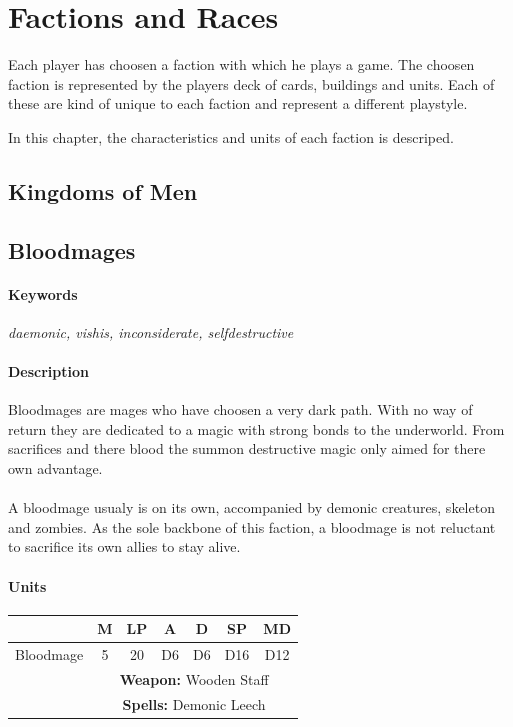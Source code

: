 \documentclass[a5paper,pagesize,10pt,bibtotoc,pointlessnumbers,
normalheadings,DIV=9,twoside=false]{scrbook}
\begin{document}
\chapter{Factions and Races}
Each player has choosen a faction with which he plays a game. The choosen faction is represented by the players deck of cards, buildings and units. Each of these are kind of unique to each faction and represent a different playstyle.

In this chapter, the characteristics and units of each faction is descriped.

\section{Kingdoms of Men}

\section{Bloodmages}

\subsubsection{Keywords}
\emph{daemonic, vishis, inconsiderate, selfdestructive}

\subsubsection{Description}
Bloodmages are mages who have choosen a very dark path. With no way of return they are dedicated to a magic with strong bonds to the underworld.
From sacrifices and there blood the summon destructive magic only aimed for there own advantage.\\
\\
A bloodmage usualy is on its own, accompanied by demonic creatures, skeleton and zombies. As the sole backbone of this faction, a bloodmage is not reluctant to sacrifice its own allies to stay alive.

\subsubsection{Units}
 \begin{tabular}{||c c c c c c c||} 
 \hline
  & M & LP & A & D & SP & MD \\
 \hline\hline
 Bloodmage & 5 & 20 & D6 & D6 & D16 & D12 \\ 
  & \multicolumn{6}{c||}{\textbf{Weapon:} Wooden Staff} \\
  & \multicolumn{6}{c||}{\textbf{Spells:} Demonic Leech} \\
 \hline

\end{tabular}
\end{document}
